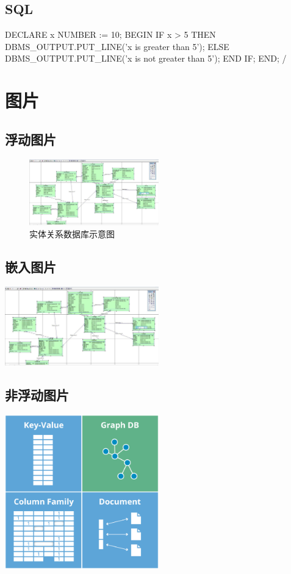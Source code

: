 \documentclass[11pt, a4paper, oneside]{ctexbook}
\begin{document}
\section{SQL}
\begin{plsql}[caption=PL/SQL程序1]
    DECLARE
    x NUMBER := 10;
    BEGIN
    IF x > 5 THEN
    DBMS_OUTPUT.PUT_LINE('x is greater than 5');
    ELSE
    DBMS_OUTPUT.PUT_LINE('x is not greater than 5');
    END IF;
    END;
    /
\end{plsql}

\chapter{图片}
\section{浮动图片}
\begin{figure}[htbp]
  \center
  \includegraphics[width=0.5\textwidth]{picture/实体关系数据库示意图.png}
  \caption{实体关系数据库示意图}
  \label{fig:relationDatabase}
\end{figure}
\section{嵌入图片}
\includegraphics[width=0.5\textwidth]{picture/实体关系数据库示意图.png}
\section{非浮动图片}
\begin{center}
  \begin{minipage}{\textwidth}
    \center
    \includegraphics[width=0.5\textwidth]{picture/NoSQL数据库示意图.png}
    \captionsetup{hypcap=false}
    \label{fig:NosqlDatabase}
  \end{minipage}
\end{center}
\end{document}
